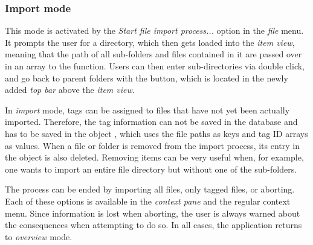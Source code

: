 \subsubsection{Import mode}

This mode is activated by the \emph{Start file import process...} option in the \emph{file} menu. It prompts the user for a directory, which then gets loaded into the \emph{item view}, meaning that the path of all sub-folders and files contained in it are passed over in an array to the  function. Users can then enter sub-directories via double click, and go back to parent folders with the \tfcode{^} button, which is located in the newly added \emph{top bar} above the \emph{item view}.

In \emph{import} mode, tags can be assigned to files that have not yet been actually imported. Therefore, the tag information can not be saved in the database and has to be saved in the object , which uses the file paths as keys and tag ID arrays as values. When a file or folder is removed from the import process, its entry in the object is also deleted. Removing items can be very useful when, for example, one wants to import an entire file directory but without one of the sub-folders.

The process can be ended by importing all files, only tagged files, or aborting. Each of these options is available in the \emph{context pane} and the regular context menu. Since information is lost when aborting, the user is always warned about the consequences when attempting to do so. In all cases, the application returns to \emph{overview} mode.

